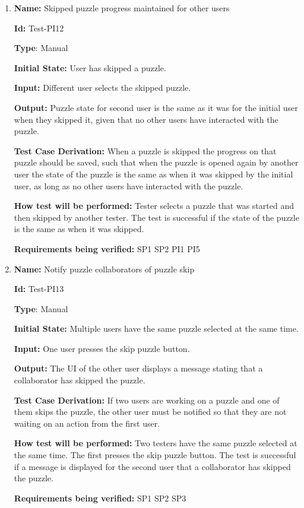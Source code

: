 \documentclass[12pt, titlepage]{article}
\begin{document}
\begin{enumerate}
\item{\textbf{Name:} Skipped puzzle progress maintained for other users}

\textbf{Id:} Test-PI12

\textbf{Type}: Manual

\textbf{Initial State:} User has skipped a puzzle.

\textbf{Input:} Different user selects the skipped puzzle.

\textbf{Output:} Puzzle state for second user is the same as it was for the initial user when they skipped it, given that no other users have interacted with the puzzle.

\textbf{Test Case Derivation:}
When a puzzle is skipped the progress on that puzzle should be saved, such that when the puzzle is opened again by another user the state of the puzzle is the same as when it was skipped by the initial user, as long as no other users have interacted with the puzzle.

\textbf{How test will be performed:}
Tester selects a puzzle that was started and then skipped by another tester. The test is successful if the state of the puzzle is the same as when it was skipped.

\textbf{Requirements being verified: } SP1 SP2 PI1 PI5

\item{\textbf{Name:} Notify puzzle collaborators of puzzle skip}

\textbf{Id:} Test-PI13

\textbf{Type}: Manual

\textbf{Initial State:} Multiple users have the same puzzle selected at the same time.

\textbf{Input:} One user presses the skip puzzle button.

\textbf{Output:} The UI of the other user displays a message stating that a collaborator has skipped the puzzle.

\textbf{Test Case Derivation:}
If two users are working on a puzzle and one of them skips the puzzle, the other user must be notified so that they are not waiting on an action from the first user.

\textbf{How test will be performed:}
Two testers have the same puzzle selected at the same time. The first presses the skip puzzle button. The test is successful if a message is displayed for the second user that a collaborator has skipped the puzzle.

\textbf{Requirements being verified: } SP1 SP2 SP3

\end{enumerate}
\end{document}
